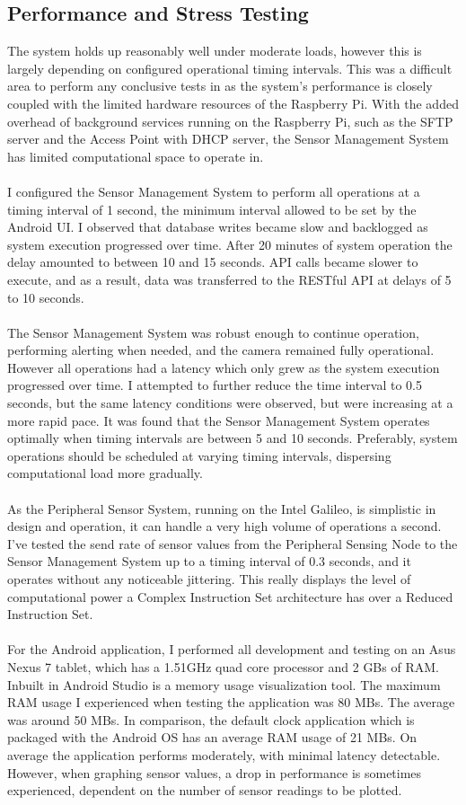 \documentclass{article}
\begin{document}
\subsection{Performance and Stress Testing}
The system holds up reasonably well under moderate loads, however this is largely  depending on configured operational timing intervals. This was a difficult area to perform any conclusive tests in as the system\rq s performance is closely coupled with the limited hardware resources of the Raspberry Pi. With the added overhead of background services running on the Raspberry Pi, such as the SFTP server and the Access Point with DHCP server, the Sensor Management System has limited computational space to operate in. 
\\\\
I configured the Sensor Management System to perform all operations at a timing interval of 1 second, the minimum interval allowed to be set by the Android UI. I observed that database writes became slow and backlogged as system execution progressed over time. After 20 minutes of system operation the delay amounted to between 10 and 15 seconds. API calls became slower to execute, and as a result, data was transferred to the RESTful API at delays of 5 to 10 seconds. \\\\
The Sensor Management System was robust enough to continue operation, performing alerting when needed, and the camera remained fully operational. However all operations had a latency which only grew as the system execution progressed over time. I attempted to further reduce the time interval to 0.5 seconds, but the same latency conditions were observed, but were increasing at a more rapid pace. It was found that the Sensor Management System operates optimally when timing intervals are between 5 and 10 seconds. Preferably, system operations should be scheduled at varying timing intervals, dispersing computational load more gradually. \\\\
As the Peripheral Sensor System, running on the Intel Galileo, is simplistic in design and operation, it can handle a very high volume of operations a second. I've tested the send rate of sensor values from the Peripheral Sensing Node to the Sensor Management System up to a timing interval of 0.3 seconds, and it operates without any noticeable jittering. This really displays the level of computational power a Complex Instruction Set architecture has over a Reduced Instruction Set. \\\\
For the Android application, I performed all development and testing on an Asus Nexus 7 tablet, which has a 1.51GHz quad core processor and 2 GBs of RAM. Inbuilt in Android Studio is a memory usage visualization tool. The maximum RAM usage I experienced when testing the application was 80 MBs. The average was around 50 MBs. In comparison, the default clock application which is packaged with the Android OS has an average RAM usage of 21 MBs. On average the application performs moderately, with minimal latency detectable. However, when graphing sensor values, a drop in performance is sometimes experienced, dependent on the number of sensor readings to be plotted. 
\end{document}
